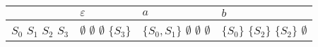 \documentclass{standalone}
\begin{document}
\begin{tabularx}{\textwidth}{XXXX}
        & \(\varepsilon\) & \(a\) & \(b\) \\
        \midrule
            \(S_0\) \newline
            \(S_1\) \newline
            \(S_2\) \newline
            \(S_3\)
            &
            \(\emptyset\) \newline
            \(\emptyset\) \newline
            \(\emptyset\) \newline
            \(\{ S_3 \}\)
            &
            \(\{ S_0, S_1 \}\) \newline
            \(\emptyset\) \newline
            \(\emptyset\) \newline
            \(\emptyset\)
            &
            \(\{S_0\}\) \newline
            \(\{S_2\}\) \newline
            \(\{S_2\}\) \newline
            \(\emptyset\)
\end{tabularx}
\end{document}
